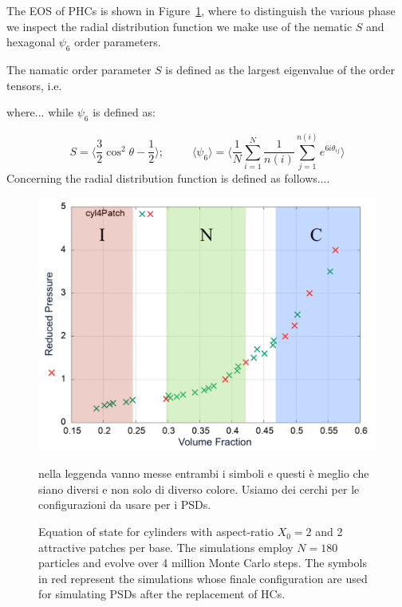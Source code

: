 \documentclass[aip,jcp, amsmath, amssymb, reprint]{revtex4-1}
\begin{document}
The EOS of PHCs is shown in Figure~\ref{fig:eos1}, where to distinguish the various phase we inspect the radial distribution function we make use of the 
nematic $S$ and hexagonal $\psi_6$ order parameters.

The namatic order parameter $S$ is defined as the largest eigenvalue of the order tensors, i.e.

where...
while $\psi_6$ is defined as:

\begin{equation}  
\label{pordnem}
S= \bigg\langle \frac{3}{2} \cos^2\theta - \frac{1}{2} \bigg\rangle; \; \; \; \; \; \; \; \; \; \langle \psi_6\rangle=\bigg\langle \frac{1}{N} \sum_{i=1}^N \frac{1}{n(i)} \sum_{j=1}^{n(i)}e^{6i\theta_{ij}} \bigg\rangle
\end{equation}
Concerning the radial distribution function is defined as follows....

\begin{figure}[h!]
\includegraphics[width=0.86\linewidth]{eos.png}
\caption{\label{fig:eos1} Equation of state for cylinders with aspect-ratio $X_0=2$ and 2 attractive patches per base. The simulations employ $N = 180$ particles and evolve over 4 million Monte Carlo steps. The symbols in red represent the simulations whose finale configuration are used for simulating PSDs after the replacement of HCs.}
{\color{red} nella leggenda vanno messe entrambi i simboli e questi è meglio che siano diversi
e non solo di diverso colore. Usiamo dei cerchi per le configurazioni da usare per i PSDs.}
\end{figure}
\end{document}
